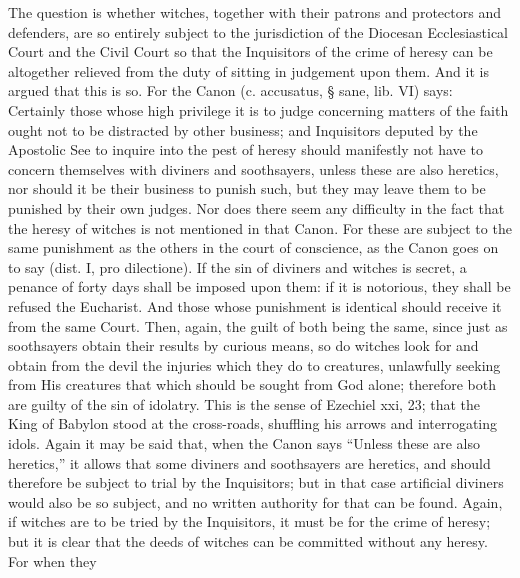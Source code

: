                                 

             The question is whether witches, together with their patrons and protectors and
       defenders, are so entirely subject to the jurisdiction of the Diocesan Ecclesiastical Court and
       the Civil Court so that the Inquisitors of the crime of heresy can be altogether relieved from
       the duty of sitting in judgement upon them. And it is argued that this is so. For the Canon (c.
       accusatus, § sane, lib. VI) says: Certainly those whose high privilege it is to judge
       concerning matters of the faith ought not to be distracted by other business; and Inquisitors
       deputed by the Apostolic See to inquire into the pest of heresy should manifestly not have to
       concern themselves with diviners and soothsayers, unless these are also heretics, nor should
       it be their business to punish such, but they may leave them to be punished by their own
       judges.
             Nor does there seem any difficulty in the fact that the heresy of witches is not
       mentioned in that Canon. For these are subject to the same punishment as the others in the
       court of conscience, as the Canon goes on to say (dist. I, pro dilectione). If the sin of
       diviners and witches is secret, a penance of forty days shall be imposed upon them: if it is
       notorious, they shall be refused the Eucharist. And those whose punishment is identical
       should receive it from the same Court. Then, again, the guilt of both being the same, since
       just as soothsayers obtain their results by curious means, so do witches look for and obtain
       from the devil the injuries which they do to creatures, unlawfully seeking from His creatures
       that which should be sought from God alone; therefore both are guilty of the sin of idolatry.
             This is the sense of Ezechiel xxi, 23; that the King of Babylon stood at the cross-roads,
       shuffling his arrows and interrogating idols.
             Again it may be said that, when the Canon says “Unless these are also heretics,” it
       allows that some diviners and soothsayers are heretics, and should therefore be subject to
       trial by the Inquisitors; but in that case artificial diviners would also be so subject, and no
       written authority for that can be found.
             Again, if witches are to be tried by the Inquisitors, it must be for the crime of heresy;
       but it is clear that the deeds of witches can be committed without any heresy. For when they
